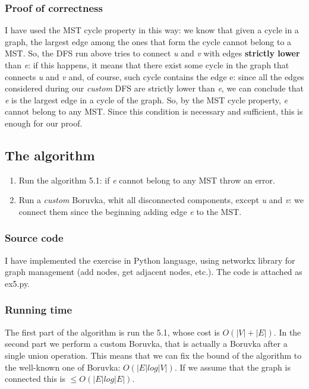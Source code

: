 \subsubsection{Proof of correctness}
I have used the MST cycle property in this way: we know that given a cycle in a graph, the largest edge among the ones that form the cycle cannot belong to a MST. So, the DFS run above tries to connect \textit{u} and \textit{v} with edges \textbf{strictly lower} than \textit{e}: if this happens, it means that there exist some cycle in the graph that connects \textit{u} and \textit{v} and, of course, such cycle contains the edge e: since all the edges considered during our \textit{custom} DFS are strictly lower than \textit{e}, we can conclude that \textit{e} is the largest edge in a cycle of the graph. So, by the MST cycle property, \textit{e} cannot belong to any MST. Since this condition is necessary and sufficient, this is enough for our proof.

\subsection{The algorithm}
\begin{enumerate}
	\item Run the algorithm 5.1: if \textit{e} cannot belong to any MST throw an error.
	\item Run a \textit{custom} Boruvka, whit all disconnected components, except \textit{u} and \textit{v}: we connect them since the beginning adding edge \textit{e} to the MST.
\end{enumerate}

\subsubsection{Source code}
I have implemented the exercise in Python language, using networkx library for graph management (add nodes, get adjacent nodes, etc.). The code is attached as ex5.py.

\subsubsection{Running time}
The first part of the algorithm is run the 5.1, whose cost is $O(|V| + |E|)$. In the second part we perform a custom Boruvka, that is actually a Boruvka after a single union operation. This means that we can fix the bound of the algorithm to the well-known one of Boruvka: $O(|E| log|V|)$. If we assume that the graph is connected this is $\leq O(|E| log|E|)$.

